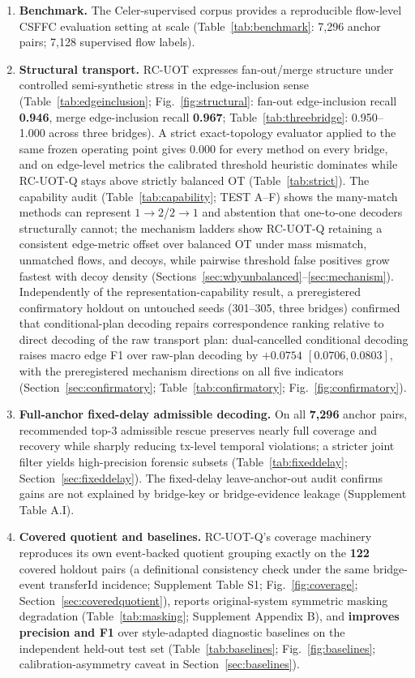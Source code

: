 \begin{enumerate}
\item \textbf{Benchmark.} The Celer-supervised corpus provides a reproducible flow-level CSFFC evaluation setting at scale (Table~\ref{tab:benchmark}: 7{,}296 anchor pairs; 7{,}128 supervised flow labels).
\item \textbf{Structural transport.} RC-UOT expresses fan-out/merge structure under controlled semi-synthetic stress in the edge-inclusion sense (Table~\ref{tab:edgeinclusion}; Fig.~\ref{fig:structural}: fan-out edge-inclusion recall \textbf{0.946}, merge edge-inclusion recall \textbf{0.967}; Table~\ref{tab:threebridge}: 0.950--1.000 across three bridges). A strict exact-topology evaluator applied to the same frozen operating point gives 0.000 for every method on every bridge, and on edge-level metrics the calibrated threshold heuristic dominates while RC-UOT-Q stays above strictly balanced OT (Table~\ref{tab:strict}). The capability audit (Table~\ref{tab:capability}; TEST A--F) shows the many-match methods can represent $1{\to}2$/$2{\to}1$ and abstention that one-to-one decoders structurally cannot; the mechanism ladders show RC-UOT-Q retaining a consistent edge-metric offset over balanced OT under mass mismatch, unmatched flows, and decoys, while pairwise threshold false positives grow fastest with decoy density (Sections~\ref{sec:whyunbalanced}--\ref{sec:mechanism}). Independently of the representation-capability result, a preregistered confirmatory holdout on untouched seeds (301--305, three bridges) confirmed that conditional-plan decoding repairs correspondence ranking relative to direct decoding of the raw transport plan: dual-cancelled conditional decoding raises macro edge F1 over raw-plan decoding by \textbf{$+0.0754$ $[0.0706, 0.0803]$}, with the preregistered mechanism directions on all five indicators (Section~\ref{sec:confirmatory}; Table~\ref{tab:confirmatory}; Fig.~\ref{fig:confirmatory}).
\item \textbf{Full-anchor fixed-delay admissible decoding.} On all \textbf{7{,}296} anchor pairs, recommended top-3 admissible rescue preserves nearly full coverage and recovery while sharply reducing tx-level temporal violations; a stricter joint filter yields high-precision forensic subsets (Table~\ref{tab:fixeddelay}; Section~\ref{sec:fixeddelay}). The fixed-delay leave-anchor-out audit confirms gains are not explained by bridge-key or bridge-evidence leakage (Supplement Table A.I).
\item \textbf{Covered quotient and baselines.} RC-UOT-Q's coverage machinery reproduces its own event-backed quotient grouping exactly on the \textbf{122} covered holdout pairs (a definitional consistency check under the same bridge-event transferId incidence; Supplement Table S1; Fig.~\ref{fig:coverage}; Section~\ref{sec:coveredquotient}), reports original-system symmetric masking degradation (Table~\ref{tab:masking}; Supplement Appendix B), and \textbf{improves precision and F1} over style-adapted diagnostic baselines on the independent held-out test set (Table~\ref{tab:baselines}; Fig.~\ref{fig:baselines}; calibration-asymmetry caveat in Section~\ref{sec:baselines}).

\end{enumerate}
